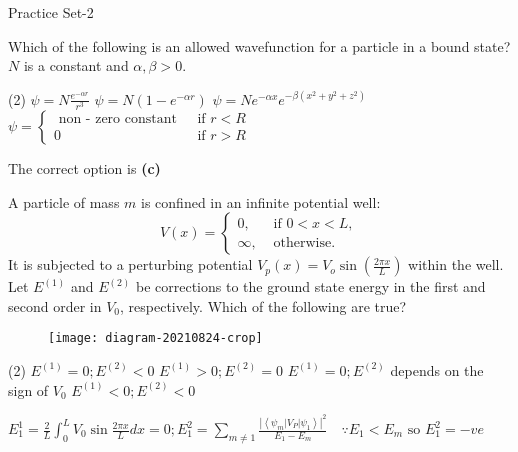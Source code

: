 \newpage
\begin{abox}
	Practice Set-2 
\end{abox}
\begin{enumerate}
	\begin{minipage}{\textwidth}
		\item Which of the following is an allowed wavefunction for a particle in a bound state? $N$ is a constant and $\alpha, \beta>0$.
	\end{minipage}
	\begin{tasks}(2)
		\task[\textbf{A.}] $\psi=N \frac{e^{-\alpha r}}{r^{3}}$ 
		\task[\textbf{B.}]$\psi=N\left(1-e^{-\alpha r}\right)$
		\task[\textbf{C.}]$\psi=N e^{-\alpha x} e^{-\beta\left(x^{2}+y^{2}+z^{2}\right)}$
		\task[\textbf{D.}]$\psi= \begin{cases}\text { non - zero constant } & \text { if } r<R \\ 0 & \text { if } r>R\end{cases}$
	\end{tasks}
	\begin{answer}
		The correct option is \textbf{(c)}	
	\end{answer}
	\begin{minipage}{\textwidth}
		\item A particle of mass $m$ is confined in an infinite potential well:
		$$
		V(x)= \begin{cases}0, & \text { if } 0<x<L, \\ \infty, & \text { otherwise. }\end{cases}
		$$
		It is subjected to a perturbing potential $V_{p}(x)=V_{o} \sin \left(\frac{2 \pi x}{L}\right)$ within the well. Let $E^{(1)}$ and $E^{(2)}$ be corrections to the ground state energy in the first and second order in $V_{0}$, respectively. Which of the following are true?
		\begin{figure}[H]
			\centering
			\texttt{[image: diagram-20210824-crop]}
		\end{figure}
	\end{minipage}
	\begin{tasks}(2)
		\task[\textbf{A.}] $E^{(1)}=0 ; E^{(2)}<0$
		\task[\textbf{B.}]$E^{(1)}>0 ; E^{(2)}=0$
		\task[\textbf{C.}]$E^{(1)}=0 ; E^{(2)}$ depends on the sign of $V_{0}$
		\task[\textbf{D.}]$E^{(1)}<0 ; E^{(2)}<0$
	\end{tasks}
	\begin{answer}
		$E_{1}^{1}=\frac{2}{L} \int_{0}^{L} V_{0} \sin \frac{2 \pi x}{L} d x=0 ; E_{1}^{2}=\sum_{m \neq 1} \frac{\left|\left\langle\psi_{m}\left|V_{P}\right| \psi_{1}\right\rangle\right|^{2}}{E_{1}-E_{m}} \quad \because E_{1}<E_{m} \text { so } E_{1}^{2}=-v e$\\

\end{answer}
\end{enumerate}
